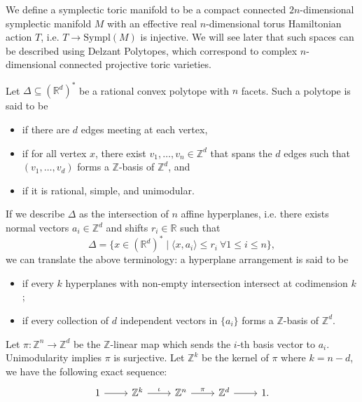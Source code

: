 \documentclass[b5paper]{article}
\newcommand{\Sympl}{\mathrm{Sympl}}
\begin{document}
We define a symplectic toric manifold to be a compact connected $2n$-dimensional symplectic manifold $M$ with an effective real $n$-dimensional torus Hamiltonian action $T$, i.e. $T \to \Sympl(M)$ is injective.
We will see later that such spaces can be described using Delzant Polytopes, which correspond to complex $n$-dimensional connected projective toric varieties.

Let $\Delta \subseteq (\mathbb{R}^d)^*$ be a rational convex polytope with $n$ facets.
Such a polytope is said to be
\begin{itemize}
    \item {} if there are $d$ edges meeting at each vertex,
    \item {} if for all vertex $x$, there exist $v_1, \dots, v_n \in \mathbb{Z}^d$ that spans the $d$ edges such that $(v_1, \dots, v_d)$ forms a $\mathbb{Z}$-basis of $\mathbb{Z}^d$, and
    \item {} if it is rational, simple, and unimodular.
\end{itemize}
If we describe $\Delta$ as the intersection of $n$ affine hyperplanes, i.e. there exists normal vectors $a_i\in \mathbb{Z}^d$ and shifts $r_i\in\mathbb{R}$ such that 
\begin{equation*}
    \Delta = \{ x \in (\mathbb{R}^d)^* \mid \langle x, a_i \rangle \leq r_i \  \forall 1 \leq i \leq n \},
\end{equation*}
we can translate the above terminology: a hyperplane arrangement is said to be
\begin{itemize}
    \item {} if every $k$ hyperplanes with non-empty intersection intersect at codimension $k$;
    \item {} if every collection of $d$ independent vectors in $\{a_i\}$ forms a $\mathbb{Z}$-basis of $\mathbb{Z}^d$.
\end{itemize}
Let $\pi:\mathbb{Z}^n\rightarrow \mathbb{Z}^d$ be the $\mathbb{Z}$-linear map which sends the $i$-th basis vector to $a_i$. Unimodularity implies $\pi$ is surjective. Let $\mathbb{Z}^k$ be the kernel of $\pi$ where $k=n-d$, we have the following exact sequence:
\begin{equation}
  \label{eq:exact_seq_Z}
  \begin{tikzcd}[row sep=small]
    1 \arrow[r] & \mathbb{Z}^k \arrow[r, "\iota"] & \mathbb{Z}^n \arrow[r, "\pi"] & \mathbb{Z}^d \arrow[r] & 1.
  \end{tikzcd}
\end{equation}
\end{document}
